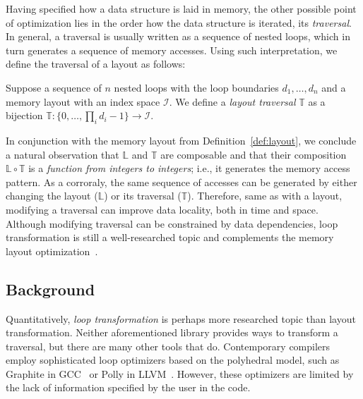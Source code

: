 Having specified how a data structure is laid in memory, the other possible point of optimization lies in the order how the data structure is iterated, its \emph{traversal}. In general, a traversal is usually written as a sequence of nested loops, which in turn generates a sequence of memory accesses. Using such interpretation, we define the traversal of a layout as follows:

\begin{defn}
  \label{def:traversal}
  Suppose a sequence of $n$ nested loops with the loop boundaries $d_1, \dots, d_n$ and a memory layout with an index space $\mathcal{I}$. We define a \emph{layout traversal} $\mathbb{T}$ as a bijection $\mathbb{T}: \{0, \dots, \prod_{i}d_i - 1\} \to \mathcal{I}$. 
\end{defn}

In conjunction with the memory layout from Definition~\ref{def:layout}, we conclude a natural observation that $\mathbb{L}$ and $\mathbb{T}$ are composable and that their composition $\mathbb{L} \circ \mathbb{T}$ is a \emph{function from integers to integers}; i.e., it generates the memory access pattern. As a corroraly, the same sequence of accesses can be generated by either changing the layout ($\mathbb{L}$) or its traversal ($\mathbb{T}$). Therefore, same as with a layout, modifying a traversal can improve data locality, both in time and space. Although modifying traversal can be constrained by data dependencies, loop transformation is still a well-researched topic and complements the memory layout optimization~\cite{clauss2000automatic}.

\subsection{Background}

Quantitatively, \emph{loop transformation} is perhaps more researched topic than layout transformation. Neither aforementioned library provides ways to transform a traversal, but there are many other tools that do. Contemporary compilers employ sophisticated loop optimizers based on the polyhedral model, such as Graphite in GCC~\cite{trifunovic2010graphite} or Polly in LLVM~\cite{grosser2012polly}. However, these optimizers are limited by the lack of information specified by the user in the code.

